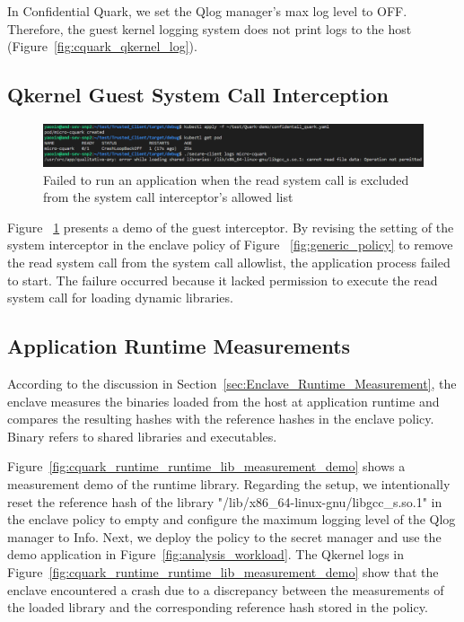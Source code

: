In Confidential Quark, we set the Qlog manager's max log level to OFF. Therefore, the guest kernel logging system does not print logs to the host (Figure~\ref{fig:cquark_qkernel_log}).

\subsection{Qkernel Guest System Call Interception}

\begin{figure}[!htb]
    \centering
    \includegraphics[width=1\textwidth]{images/application_failed_to_start_due_to_syscall_interceptor.png}
    \caption[Failed to run an application when the read system call is excluded from the system call interceptor's allowed list]{Failed to run an application when the read system call is excluded from the system call interceptor's allowed list}
    \label{fig:application_failed_to_start_due_to_syscall_interceptor}
\end{figure}


Figure ~\ref{fig:application_failed_to_start_due_to_syscall_interceptor} presents a demo of the guest interceptor. By revising the setting of the system interceptor in the enclave policy of Figure ~\ref{fig:generic_policy} to remove the read system call from the system call allowlist, 
the application process failed to start. The failure occurred because it lacked permission to execute the read system call for loading dynamic libraries.

\subsection{Application Runtime Measurements}




According to the discussion in Section~\ref{sec:Enclave_Runtime_Measurement}, the enclave measures the binaries loaded from the host at application runtime and compares the resulting hashes with the reference hashes in the enclave policy. Binary refers to shared libraries and executables. 

Figure~\ref{fig:cquark_runtime_runtime_lib_measurement_demo} shows a measurement demo of the runtime library. Regarding the setup, we intentionally reset the reference hash of the library "/lib/x86\_64-linux-gnu/libgcc\_s.so.1" in the enclave policy to empty and configure the maximum logging level of the Qlog manager to Info. Next, 
we deploy the policy to the secret manager and use the demo application in Figure~\ref{fig:analysis_workload}. The Qkernel logs in Figure~\ref{fig:cquark_runtime_runtime_lib_measurement_demo} show that the enclave encountered a crash due to a discrepancy between the measurements of the loaded library and the corresponding reference hash stored in the policy.


